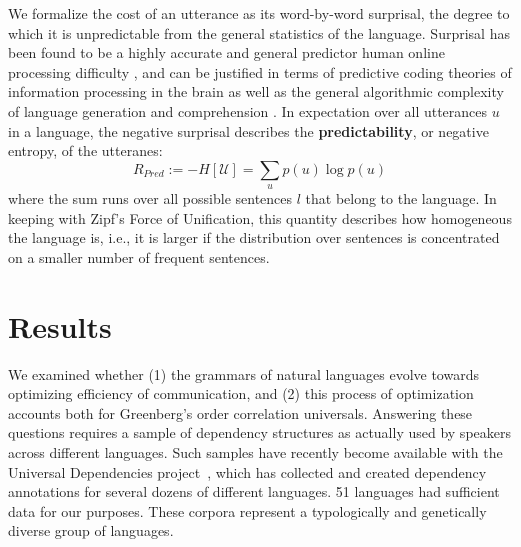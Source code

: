 \documentclass[9pt,twocolumn,twoside,lineno]{pnas-new}
\newcommand{\key}[1]{\textbf{#1}}
\begin{document}
We formalize the cost of an utterance as its word-by-word surprisal, the degree to which it is unpredictable from the general statistics of the language.
Surprisal has been found to be a highly accurate and general predictor human online processing difficulty \cite{hale2001probabilistic,levy2008expectation,smith2013effect}, and can be justified  in terms of predictive coding theories of information processing in the brain \cite{friston2009predictive} as well as the general algorithmic complexity of language generation and comprehension \cite{li2008introduction}.
In expectation over all utterances $u$ in a language, the negative surprisal describes the \key{predictability}, or negative entropy, of the utteranes: %
\begin{equation}
	R_{Pred} := - H[\mathcal{U}] = \sum_{u} p(u) \log p(u)
\end{equation}
where the sum runs over all possible sentences $l$ that belong to the language.
In keeping with Zipf's Force of Unification, this quantity describes how homogeneous the language is, i.e., it is larger if the distribution over sentences is concentrated on a smaller number of frequent sentences. %



\section{Results}

We examined whether
(1) the grammars of natural languages evolve towards optimizing efficiency of communication, and
(2) this process of optimization accounts both for Greenberg's order correlation universals.
Answering these questions requires a sample of dependency structures as actually used by speakers across different languages.
Such samples have recently become available with the Universal Dependencies project~\cite{nivre2017universal}, which has collected and created dependency annotations for several dozens of different languages.
51 languages had sufficient data for our purposes. %
These corpora represent a typologically and genetically diverse group of languages.
\end{document}
